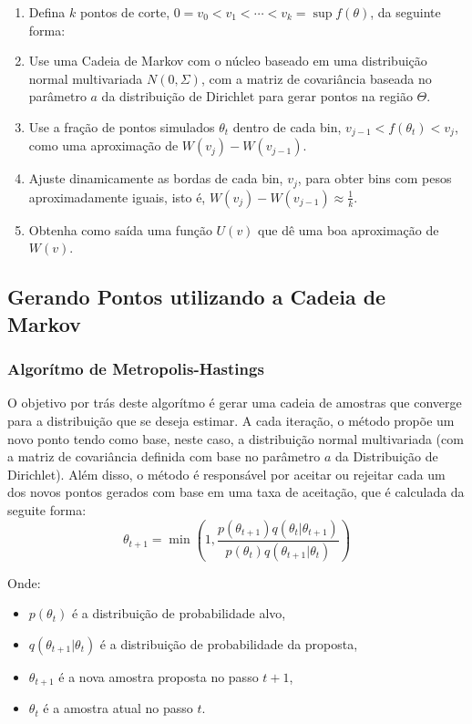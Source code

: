 \documentclass{article}
\begin{document}
\begin{enumerate}
    \item Defina $k$ pontos de corte, $0=v_0 < v_1 < \cdots < v_k = \sup f(\theta)$, da seguinte forma:

    \item Use uma Cadeia de Markov com o núcleo baseado em uma distribuição normal multivariada $N(0,\Sigma)$, com a matriz de covariância baseada no parâmetro $a$ da distribuição de Dirichlet para gerar pontos na região $\Theta$. 
    
    \item Use a fração de pontos simulados $\theta_t$ dentro de cada bin, $v_{j-1} < f(\theta_t) < v_j$, como uma aproximação de $W(v_j) - W(v_{j-1})$.
    
    \item Ajuste dinamicamente as bordas de cada bin, $v_j$, para obter bins com pesos aproximadamente iguais, isto é, $W(v_j) - W(v_{j-1}) \approx \frac{1}{k}$.
    
    \item Obtenha como saída uma função $U(v)$ que dê uma boa aproximação de $W(v)$.
\end{enumerate}

\subsection{Gerando Pontos utilizando a Cadeia de Markov}
\subsubsection{Algorítmo de Metropolis-Hastings}
 O objetivo por trás deste algorítmo é gerar uma cadeia de amostras que converge para a distribuição que se deseja estimar. A cada iteração, o método propõe um novo ponto tendo como base, neste caso, a distribuição normal multivariada (com a matriz de covariância definida com base no parâmetro $a$ da Distribuição de Dirichlet). Além disso, o método é responsável por aceitar ou rejeitar cada um dos novos pontos gerados com base em uma taxa de aceitação, que é calculada da seguite forma:
\\
\[
\theta_{t+1} = \min\left(1, \frac{p(\theta_{t+1})q(\theta_{t}|\theta_{t+1})}{p(\theta_{t})q(\theta_{t+1}|\theta_{t})}\right)
\]

Onde:
\begin{itemize}
    \item \( p(\theta_{t}) \) é a distribuição de probabilidade alvo,
    \item \( q(\theta_{t+1}|\theta_{t}) \) é a distribuição de probabilidade da proposta,
    \item \( \theta_{t+1} \) é a nova amostra proposta no passo \( t+1 \),
    \item \( \theta_{t} \) é a amostra atual no passo \( t \).
\end{itemize}
\end{document}
